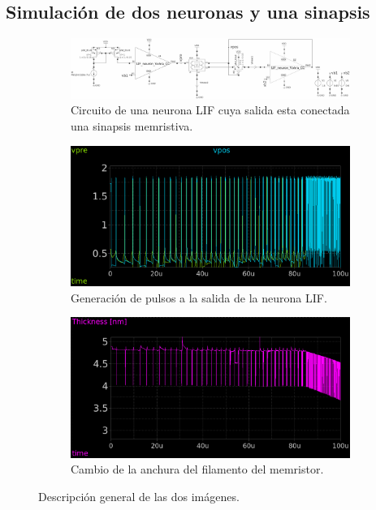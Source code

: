 \documentclass[conference]{IEEEtran}
\begin{document}
\subsection{Simulación de dos neuronas y una sinapsis}
\begin{figure}[htbp]
    \centering
    \begin{subfigure}[b]{0.45\textwidth}
        \centering
        \includegraphics[width=\textwidth]{img/2LIF.png}
        \caption{Circuito de una neurona LIF cuya salida esta conectada una sinapsis memristiva.}
        \label{fig:2LIF}
    \end{subfigure}
    \hfill
    \begin{subfigure}[b]{0.45\textwidth}
        \centering
        \includegraphics[width=\textwidth]{img/2LIF_V.png}
        \caption{Generación de pulsos a la salida de la neurona LIF.}
        \label{fig:2LIF_V}
    \end{subfigure}
    \hfill
    \begin{subfigure}[b]{0.45\textwidth}
        \centering
        \includegraphics[width=\textwidth]{img/2LIF_T.png}
        \caption{Cambio de la anchura del filamento del memristor.}
        \label{fig:2LIF_T}
    \end{subfigure}
    \caption{Descripción general de las dos imágenes.}
    \label{fig:LIF2}
\end{figure}
\end{document}
